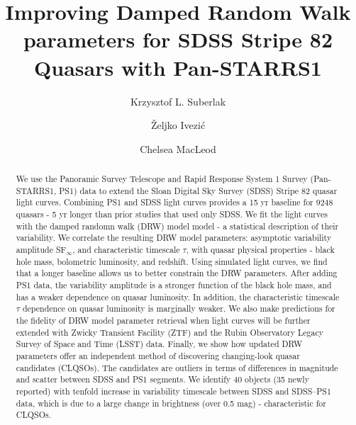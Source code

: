 \documentclass[twocolumn]{aastex62}
\begin{document}
\title{Improving Damped Random Walk parameters for SDSS Stripe 82 Quasars with Pan-STARRS1}


\author[0000-0002-9589-1306]{Krzysztof L. Suberlak}


\author[0000-0001-5250-2633]{\v{Z}eljko Ivezi\'c}


\author[0000-0003-3422-2202]{Chelsea MacLeod}


\begin{abstract}

We use the Panoramic Survey Telescope and Rapid Response System 1 Survey (Pan-STARRS1, PS1) data to extend  the Sloan Digital Sky Survey (SDSS) Stripe 82 quasar light curves. Combining PS1 and SDSS light curves provides a 15 yr baseline for 9248 quasars - 5 yr longer than prior studies that used only SDSS. We fit the light curves with the damped randomn walk (DRW) model model - a statistical description of their variability. We correlate the resulting DRW model parameters: asymptotic variability amplitude SF$_{\infty}$, and characteristic timescale $\tau$, with quasar physical properties - black hole mass, bolometric luminosity, and redshift. Using simulated light curves, we find that a longer baseline allows us to better constrain the DRW parameters. After adding PS1 data, the variability amplitude is a stronger function of the black hole mass, and has a weaker dependence on quasar luminosity. In addition, the characteristic timescale $\tau$ dependence on quasar luminosity is marginally weaker. We also make predictions for the fidelity of DRW model parameter retrieval when light curves will be further extended with Zwicky Transient Facility (ZTF) and the Rubin Observatory Legacy Survey of Space and Time (LSST) data. Finally, we show how updated DRW parameters offer an independent method of discovering changing-look quasar candidates (CLQSOs). The candidates are outliers in terms of differences in magnitude and scatter between SDSS and PS1 segments. We identify 40 objects (35 newly reported) with tenfold increase in variability timescale between SDSS and SDSS--PS1 data, which is due to a large change in brightness (over 0.5 mag) - characteristic for CLQSOs. 


\end{abstract}
\end{document}
